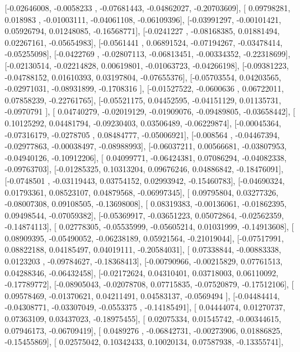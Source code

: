\documentclass{article}
\begin{document}
       [-0.02646008, -0.0058233 , -0.07681443, -0.04862027, -0.20703609],
       [ 0.09798281,  0.018983  , -0.01003111, -0.04061108, -0.06109396],
       [-0.03991297, -0.00101421,  0.05926794,  0.01248085, -0.16568771],
       [-0.0241227 , -0.08168385,  0.01881494,  0.02267161, -0.05654983],
       [-0.0561441 ,  0.06891524, -0.07194267, -0.03478414, -0.05255098],
       [-0.0422769 , -0.02807113, -0.06813451, -0.00334352, -0.22318699],
       [-0.02130514, -0.02214828,  0.00619801, -0.01063723, -0.04266198],
       [-0.09381223, -0.04788152,  0.01610393,  0.03197804, -0.07655376],
       [-0.05703554,  0.04203565, -0.02971031, -0.08931899, -0.1708316 ],
       [-0.01527522, -0.0600636 ,  0.06722011,  0.07858239, -0.22761765],
       [-0.05521175,  0.04452595, -0.04151129,  0.01135731, -0.0970791 ],
       [ 0.04740279, -0.02019129, -0.01909076, -0.09489805, -0.03658442],
       [ 0.10125292,  0.04481794, -0.09230403,  0.03506489, -0.06229874],
       [-0.00045364, -0.07316179, -0.0278705 ,  0.08484777, -0.05006921],
       [-0.008564  , -0.04467394, -0.02977863, -0.00038497, -0.08988993],
       [-0.06037211,  0.00566681, -0.03807953, -0.04940126, -0.10912206],
       [ 0.04099771, -0.06424381,  0.07086294, -0.04082338, -0.09763703],
       [-0.01285325,  0.10313204,  0.09676246,  0.04886842, -0.18476091],
       [-0.0748501 , -0.03119443,  0.03754152,  0.02993942, -0.15460783],
       [-0.04690324,  0.01793361,  0.08523107,  0.04879568, -0.06997345],
       [ 0.09795804,  0.03277326, -0.08007308,  0.09108505, -0.13698008],
       [ 0.08319383, -0.00136061, -0.01862395,  0.09498544, -0.07059382],
       [-0.05369917, -0.03651223,  0.05072864, -0.02562359, -0.14874113],
       [ 0.02778305, -0.05535999, -0.05605214,  0.01031999, -0.14913608],
       [ 0.08909395, -0.05490052, -0.06238189,  0.05921564, -0.21019044],
       [-0.07517991,  0.08822188,  0.04185497,  0.04019111, -0.20584031],
       [ 0.07338844, -0.00883338,  0.0123203 , -0.09784627, -0.18368413],
       [-0.00790966, -0.00215829,  0.07761513,  0.04288346, -0.06432458],
       [-0.02172624,  0.04310401,  0.03718003,  0.06110092, -0.17789772],
       [-0.08905043, -0.02078708,  0.07715835, -0.07520879, -0.17512106],
       [ 0.09578469, -0.01370621,  0.04211491,  0.04583137, -0.0569494 ],
       [-0.04484414, -0.04308771, -0.03307049, -0.0553375 , -0.14185491],
       [ 0.04444074,  0.01270737,  0.07363109,  0.03437023, -0.18975455],
       [ 0.02075334,  0.01545742, -0.00344615,  0.07946173, -0.06709419],
       [ 0.0489276 , -0.06842731, -0.00273906,  0.01886825, -0.15455869],
       [ 0.02575042,  0.10342433,  0.10020134,  0.07587938, -0.13355741],
\end{document}
